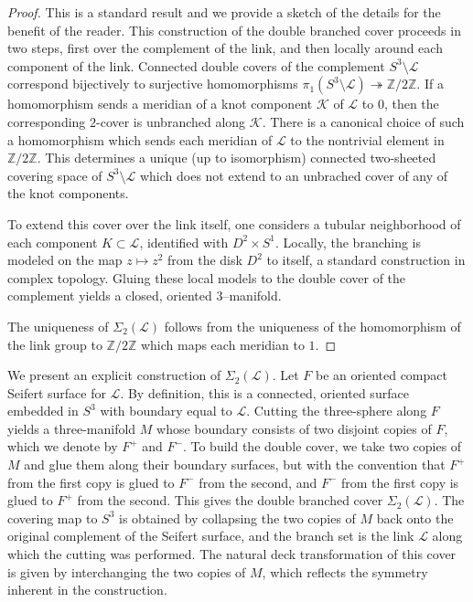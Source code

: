 \documentclass[table]{amsart}
\newcommand{\cK}{\mathcal{K}}
\newcommand{\Z}{\mathbb{Z}}
\newcommand{\cL}{\mathcal{L}}
\newcommand{\cover}{\Sigma_2}
\numberwithin{equation}{section}
\begin{document}
\begin{proof}
This is a standard result and we provide a sketch of the details for the benefit of the reader. This construction of the double branched cover proceeds in two steps, first over the complement of the link, and then locally around each component of the link. Connected double covers of the complement $S^3 \setminus \cL$ correspond bijectively to surjective homomorphisms $\pi_1(S^3 \setminus \cL) \twoheadrightarrow \mathbb{Z}/2\mathbb{Z}$. If a homomorphism sends a meridian of a knot component $\cK$ of $\cL$ to $0$, then the corresponding $2$-cover is unbranched along $\cK$. There is a canonical choice of such a homomorphism which sends each meridian of $\cL$ to the nontrivial element in $\mathbb{Z}/2\mathbb{Z}$. This determines a unique (up to isomorphism) connected two-sheeted covering space of $S^3 \setminus \cL$ which does not extend to an unbrached cover of any of the knot components.

\par To extend this cover over the link itself, one considers a tubular neighborhood of each component $K \subset \cL$, identified with $D^2 \times S^1$. Locally, the branching is modeled on the map $z \mapsto z^2$ from the disk $D^2$ to itself, a standard construction in complex topology. Gluing these local models to the double cover of the complement yields a closed, oriented $3$--manifold.  

\par The uniqueness of $\Sigma_2(\cL)$ follows from the uniqueness of the homomorphism of the link group to $\Z/2\Z$ which maps each meridian to $1$.
\end{proof}

\par We present an explicit construction of $\Sigma_2(\cL)$. Let $F$ be an oriented compact Seifert surface for $\cL$. By definition, this is a connected, oriented surface embedded in $S^3$ with boundary equal to $\cL$. Cutting the three-sphere along $F$ yields a three-manifold $M$ whose boundary consists of two disjoint copies of $F$, which we denote by $F^+$ and $F^-$. To build the double cover, we take two copies of $M$ and glue them along their boundary surfaces, but with the convention that $F^+$ from the first copy is glued to $F^-$ from the second, and $F^-$ from the first copy is glued to $F^+$ from the second. This gives the double branched cover $\cover(\cL)$. The covering map to $S^3$ is obtained by collapsing the two copies of $M$ back onto the original complement of the Seifert surface, and the branch set is the link $\cL$ along which the cutting was performed. The natural deck transformation of this cover is given by interchanging the two copies of $M$, which reflects the symmetry inherent in the construction.
\end{document}
